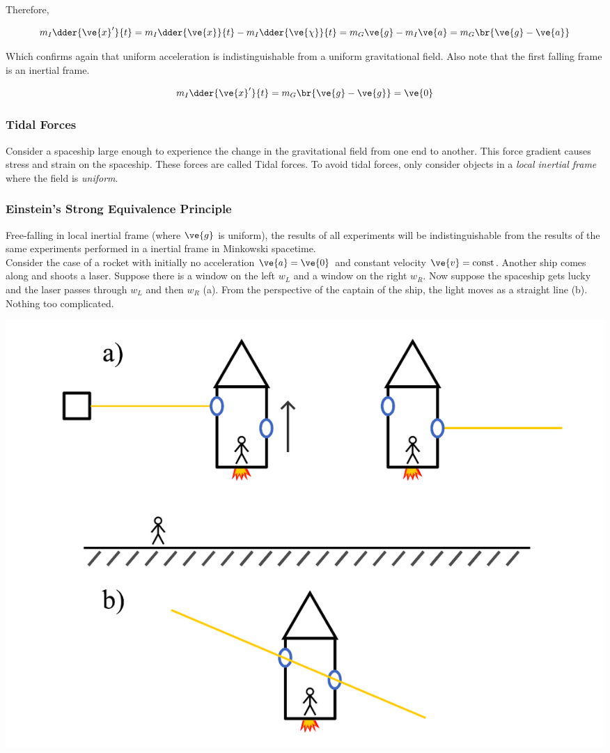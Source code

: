 \documentclass{article}
\begin{document}
Therefore,

\[ m_I \dder{\ve{x}'}{t} = m_I \dder{\ve{x}}{t} - m_I \dder{\ve{\chi}}{t} = m_G \ve{g} - m_I \ve{a} = m_G \br{\ve{g} - \ve{a}} \]

Which confirms again that uniform acceleration is indistinguishable from a uniform gravitational field. Also note that the first falling frame is an inertial frame.

\[ m_I \dder{\ve{x}'}{t} = m_G\br{\ve{g} - \ve{g}} = \ve{0} \]

\subsubsection{Tidal Forces}

Consider a spaceship large enough to experience the change in the gravitational field from one end to another. This force gradient causes stress and strain on the spaceship. These forces are called Tidal forces. To avoid tidal forces, only consider objects in a \textit{local inertial frame} where the field is \textit{uniform}.

\subsubsection{Einstein's Strong Equivalence Principle}

Free-falling in local inertial frame (where $\ve{g}$ is uniform), the results of all experiments will be indistinguishable from the results of the same experiments performed in a inertial frame in Minkowski spacetime.\\

Consider the case of a rocket with initially no acceleration $\ve{a} = \ve{0}$ and constant velocity $\ve{v} = \text{const}$. Another ship comes along and shoots a laser. Suppose there is a window on the left $w_L$ and a window on the right $w_R$. Now suppose the spaceship gets lucky and the laser passes through $w_L$ and then $w_R$ (a). From the perspective of the captain of the ship, the light moves as a straight line (b). Nothing too complicated. \\

\begin{center}
    \includegraphics[scale=0.7]{figures/bend_light/constant_v.pdf}
\end{center}
\end{document}
